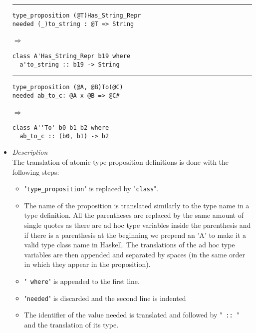 \documentclass[diploma]{softlab-thesis}
\def\H{Haskell}
\def\lra{$\Longrightarrow$\ }
\begin{document}
\begin{itemize}
\begin{minipage}{0.40\linewidth}
\rule{\linewidth}{0.1pt}

\begin{verbatim}
type_proposition (@T)Has_String_Repr
needed (_)to_string : @T => String
\end{verbatim}

\lra

\begin{verbatim}
class A'Has_String_Repr b19 where
  a'to_string :: b19 -> String
\end{verbatim}

\rule{\linewidth}{0.1pt}

\begin{verbatim}
type_proposition (@A, @B)To(@C)
needed ab_to_c: @A x @B => @C#
\end{verbatim}

\lra

\begin{verbatim}
class A''To' b0 b1 b2 where
  ab_to_c :: (b0, b1) -> b2
\end{verbatim}

\end{minipage}

\item
\textit{Description}\\

The translation of atomic type proposition definitions is done with the
following steps:

\begin{itemize}

\item
"\texttt{type_proposition}" is replaced by "\texttt{class}".

\item
The name of the proposition is translated similarly to the type name in a type
definition. All the parentheses are replaced by the same amount of single
quotes as there are ad hoc type variables inside the parenthesis and if there
is a parenthesis at the beginning we prepend an 'A' to make it a valid type
class name in \H. The translations of the ad hoc type variables are then
appended and separated by spaces (in the same order in which they appear in the
proposition).

\item
"\texttt{ where}" is appended to the first line.

\item
"\texttt{needed}" is discarded and the second line is indented

\item
The identifier of the value needed is translated and followed by "\verb| :: |"
and the translation of its type.

\end{itemize}

\end{itemize}
\end{document}

